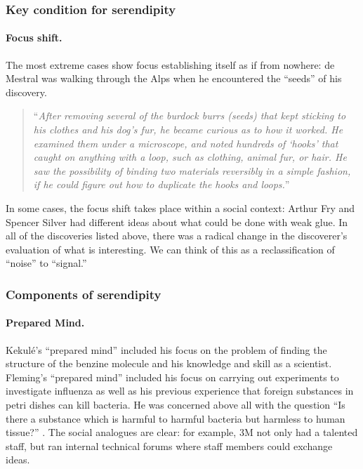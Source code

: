 \documentclass{llncs}
\begin{document}
\subsubsection*{Key condition for serendipity}

\paragraph{Focus shift.}
The most extreme cases show focus establishing itself as if from
nowhere: de Mestral was walking through the Alps when he encountered
the ``seeds'' of his discovery.
\begin{quote}
``\emph{After removing several of the burdock burrs (seeds) that kept sticking to his clothes and his dog's fur, he became curious as to how it worked. He examined them under a microscope, and noted hundreds of `hooks' that caught on anything with a loop, such as clothing, animal fur, or hair. He saw the possibility of binding two materials reversibly in a simple fashion, if he could figure out how to duplicate the hooks and loops.}''~\cite{wiki:velcro}
\end{quote}
In some cases, the focus shift takes place within a social context:
Arthur Fry and Spencer Silver had different ideas about what could be
done with weak glue.
%
In all of the discoveries listed above, there was a radical change in
the discoverer's evaluation of what is interesting.  We can think of
this as a reclassification of ``noise'' to ``signal.''

\subsubsection*{Components of serendipity}

\paragraph{Prepared Mind.}

Kekul\'e's ``prepared mind'' included his focus on the problem of
finding the structure of the benzine molecule and his knowledge and
skill as a scientist.  Fleming's ``prepared mind'' included his focus
on carrying out experiments to investigate influenza as well as his
previous experience that foreign substances in petri dishes can kill
bacteria.  He was concerned above all with the question ``Is there a
substance which is harmful to harmful bacteria but harmless to human
tissue?''  \cite[p. 161]{roberts}.  The social analogues are clear:
for example, 3M not only had a talented staff, but ran internal
technical forums where staff members could exchange ideas.
 
\end{document}
